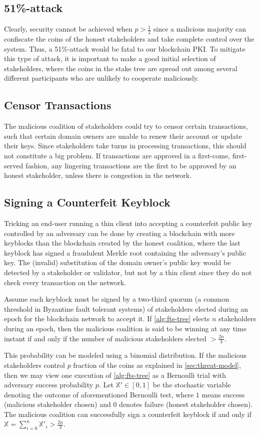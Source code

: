 \documentclass{style/kththesis}
\begin{document}
\subsection{51\%-attack}
Clearly, security cannot be achieved when $p > \frac{1}{2}$ since a malicious majority can confiscate the coins of the honest stakeholders and take complete control over the system. Thus, a 51\%-attack would be fatal to our blockchain PKI. To mitigate this type of attack, it is important to make a good initial selection of stakeholders, where the coins in the stake tree are spread out among several different participants who are unlikely to cooperate maliciously.

\subsection{Censor Transactions}
The malicious coalition of stakeholders could try to censor certain transactions, such that certain domain owners are unable to renew their account or update their keys. Since stakeholders take turns in processing transactions, this should not constitute a big problem. If transactions are approved in a first-come, first-served fashion, any lingering transactions are the first to be approved by an honest stakeholder, unless there is congestion in the network.

\subsection{Signing a Counterfeit Keyblock}
Tricking an end-user running a thin client into accepting a counterfeit public key controlled by an adversary can be done by creating a blockchain with more keyblocks than the blockchain created by the honest coalition, where the last keyblock has signed a fraudulent Merkle root containing the adversary's public key. The (invalid) substitution of the domain owner's public key would be detected by a stakeholder or validator, but not by a thin client since they do not check every transaction on the network.

Assume each keyblock must be signed by a two-third quorum (a common threshold in Byzantine fault tolerant systems) of stakeholders elected during an epoch for the blockchain network to accept it. If \cref{alg:fts-tree} elects $n$ stakeholders during an epoch, then the malicious coalition is said to be winning at any time instant if and only if the number of malicious stakeholders elected $> \frac{2n}{3}$.

This probability can be modeled using a binomial distribution. If the malicious stakeholders control $p$ fraction of the coins as explained in \cref{sec:threat-model}, then we may view one execution of \cref{alg:fts-tree} as a Bernoulli trial with adversary success probability $p$. Let $\mathbb{X}' \in [0, 1]$ be the stochastic variable denoting the outcome of aforementioned Bernoulli test, where $1$ means success (malicious stakeholder chosen) and $0$ denotes failure (honest stakeholder chosen). The malicious coalition can successfully sign a counterfeit keyblock if and only if $\mathbb{X} = \sum_{i = 0}^{n}{\mathbb{X}'_i} > \frac{2n}{3}$.
\end{document}
